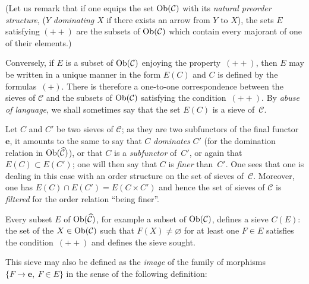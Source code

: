 \noindent
(Let us remark that if one equips the set \(\operatorname{Ob}(\mathcal{C})\) with its
\emph{natural preorder structure},
(\(Y\) \emph{dominating} \(X\) if there exists an arrow from \(Y\) to \(X\)),
the sets \(E\) satisfying \((++)\) are the subsets of \(\operatorname{Ob}(\mathcal{C})\)
which contain every majorant%
{\renewcommand{\thefootnote}{(17)}}
of one of their elements.)

Conversely, if \(E\) is a subset of \(\operatorname{Ob}(\mathcal{C})\) enjoying the
property~\((++)\), then \(E\) may be written in a unique manner in the form
\(E(C)\) and \(C\) is defined by the formulas~\((+)\). There is therefore a
one-to-one correspondence between the sieves of \(\mathcal{C}\) and the
subsets of \(\operatorname{Ob}(\mathcal{C})\) satisfying the condition~\((++)\). By
\emph{abuse of language}, we shall sometimes say that the set \(E(C)\) is
a sieve of~\(\mathcal{C}\).

{\renewcommand{\thefootnote}{(18)}}%
Let \(C\) and \(C'\) be two sieves of \(\mathcal{C}\); as they are two
subfunctors of the final functor \(\mathbf{e}\), it amounts to the same to
say that \(C\) \emph{dominates} \(C'\) (for the domination relation in
\(\operatorname{Ob}(\widehat{\mathcal{C}})\)), or that \(C\) is a \emph{subfunctor}
of~\(C'\), or again that \(E(C)\subset E(C')\); one will then say that
\(C\) is \emph{finer} than~\(C'\). One sees that one is dealing in this
case with an order structure on the set of sieves of~\(\mathcal{C}\).
Moreover, one has \(E(C)\cap E(C')=E(C\times C')\) and hence the set of
sieves of \(\mathcal{C}\) is \emph{filtered} for the order relation ``being
finer''.

Every subset \(E\) of \(\operatorname{Ob}(\widehat{\mathcal{C}})\), for example a subset
of \(\operatorname{Ob}(\mathcal{C})\), defines a sieve \(C(E)\): the set of the
\(X\in\operatorname{Ob}(\mathcal{C})\) such that \(F(X)\neq\varnothing\) for at least one
\(F\in E\) satisfies the condition~\((++)\) and defines the sieve sought.

This sieve may also be defined as the \emph{image} of the family of
morphisms \(\{F\to\mathbf{e},\ F\in E\}\) in the sense of the following
definition:

